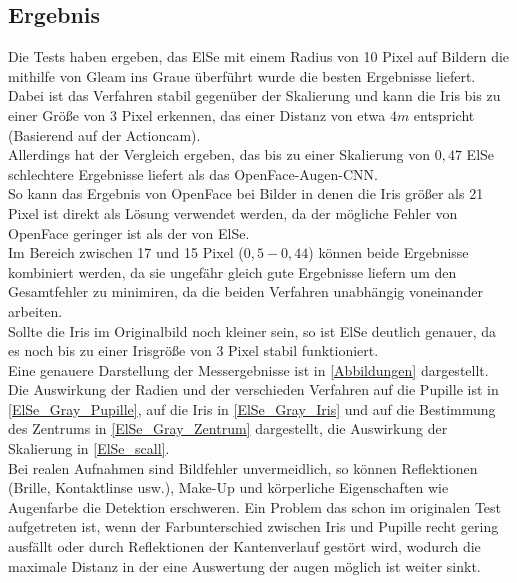 \subsection{Ergebnis}
Die Tests haben ergeben, das ElSe mit einem Radius von 10 Pixel auf Bildern die mithilfe von Gleam ins Graue überführt wurde die besten Ergebnisse liefert. Dabei ist das Verfahren stabil gegenüber der Skalierung und kann die Iris bis zu einer Größe von 3 Pixel erkennen, das einer Distanz von etwa $4m$ entspricht (Basierend auf der Actioncam).\\
Allerdings hat der Vergleich ergeben, das bis zu einer Skalierung von $0,47$ ElSe schlechtere Ergebnisse liefert als das OpenFace-Augen-CNN.\\
So kann das Ergebnis von OpenFace bei Bilder in denen die Iris größer als 21 Pixel ist direkt als Lösung verwendet werden, da der mögliche Fehler von OpenFace geringer ist als der von ElSe.\\
Im Bereich zwischen 17 und 15 Pixel ($0,5-0,44$) können beide Ergebnisse kombiniert werden, da sie ungefähr gleich gute Ergebnisse liefern um den Gesamtfehler zu minimiren, da die beiden Verfahren unabhängig voneinander arbeiten.\\
Sollte die Iris im Originalbild noch kleiner sein, so ist ElSe deutlich genauer, da es noch bis zu einer Irisgröße von 3 Pixel stabil funktioniert.\\
Eine genauere Darstellung der Messergebnisse ist in \autoref{Abbildungen} dargestellt. Die Auswirkung der Radien und der verschieden Verfahren auf die Pupille ist in \autoref{ElSe_Gray_Pupille}, auf die Iris in \autoref{ElSe_Gray_Iris} und auf die Bestimmung des Zentrums in \autoref{ElSe_Gray_Zentrum} dargestellt, die Auswirkung der Skalierung in \autoref{ElSe_scall}.\\
Bei realen Aufnahmen sind Bildfehler unvermeidlich, so können Reflektionen (Brille, Kontaktlinse usw.), Make-Up und körperliche Eigenschaften wie Augenfarbe die Detektion erschweren. Ein Problem das schon im originalen Test \cite{ElSe} aufgetreten ist, wenn der Farbunterschied zwischen Iris und Pupille recht gering ausfällt oder durch Reflektionen der Kantenverlauf gestört wird, wodurch die maximale Distanz in der eine Auswertung der augen möglich ist weiter sinkt.